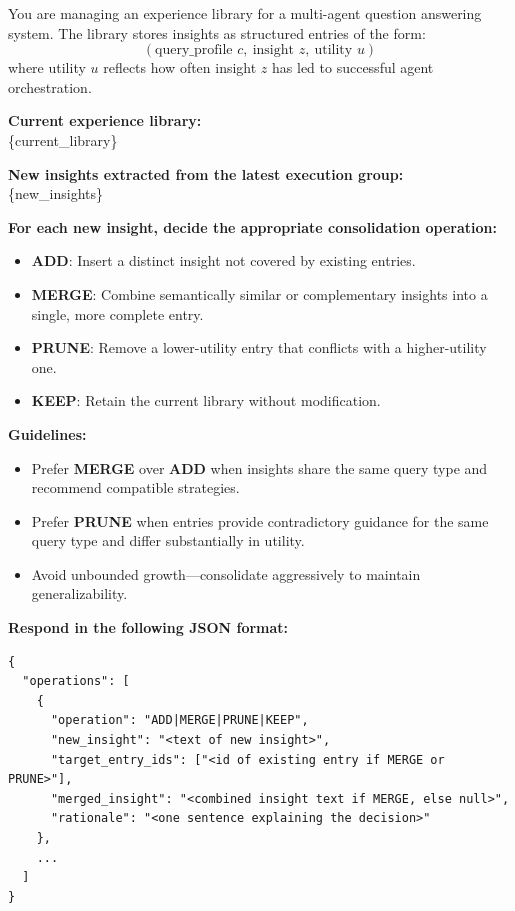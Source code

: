 \begin{tcolorbox}[
    colback=promptbg!100!white,
    sharp corners=south, 
    boxrule=0.25mm, 
    fonttitle=\bfseries, 
    title={\textbf{Experience Library Operations)}}, 
    width=\textwidth, 
    enhanced,
    drop shadow
    ]
You are managing an experience library for a multi-agent question answering system. 
The library stores insights as structured entries of the form:
\[
(\text{query\_profile } c,\ \text{insight } z,\ \text{utility } u)
\]
where utility $u$ reflects how often insight $z$ has led to successful agent orchestration.

\vspace{0.5em}
\textbf{Current experience library:} \\
\{current\_library\}

\vspace{0.5em}
\textbf{New insights extracted from the latest execution group:} \\
\{new\_insights\}

\vspace{0.5em}
\textbf{For each new insight, decide the appropriate consolidation operation:}
\begin{itemize}
    \item \textbf{ADD}: Insert a distinct insight not covered by existing entries.
    \item \textbf{MERGE}: Combine semantically similar or complementary insights into a single, more complete entry.
    \item \textbf{PRUNE}: Remove a lower-utility entry that conflicts with a higher-utility one.
    \item \textbf{KEEP}: Retain the current library without modification.
\end{itemize}

\vspace{0.5em}
\textbf{Guidelines:}
\begin{itemize}
    \item Prefer \textbf{MERGE} over \textbf{ADD} when insights share the same query type and recommend compatible strategies.
    \item Prefer \textbf{PRUNE} when entries provide contradictory guidance for the same query type and differ substantially in utility.
    \item Avoid unbounded growth—consolidate aggressively to maintain generalizability.
\end{itemize}

\vspace{0.5em}
\textbf{Respond in the following JSON format:}
\begin{verbatim}
{
  "operations": [
    {
      "operation": "ADD|MERGE|PRUNE|KEEP",
      "new_insight": "<text of new insight>",
      "target_entry_ids": ["<id of existing entry if MERGE or PRUNE>"],
      "merged_insight": "<combined insight text if MERGE, else null>",
      "rationale": "<one sentence explaining the decision>"
    },
    ...
  ]
}
\end{verbatim}
\end{tcolorbox}


